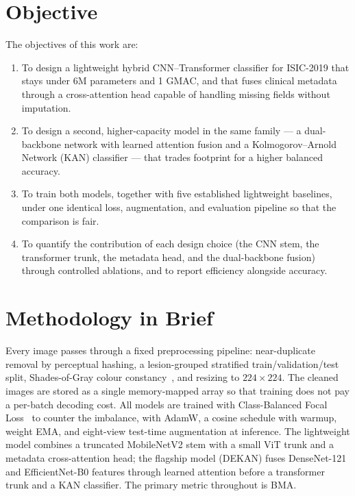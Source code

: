\section{Objective}

The objectives of this work are:

\begin{enumerate}
  \item To design a lightweight hybrid CNN--Transformer classifier for
        ISIC-2019 that stays under 6M parameters and 1 GMAC, and that fuses
        clinical metadata through a cross-attention head capable of handling
        missing fields without imputation.
  \item To design a second, higher-capacity model in the same family --- a
        dual-backbone network with learned attention fusion and a
        Kolmogorov--Arnold Network (KAN) classifier --- that trades footprint
        for a higher balanced accuracy.
  \item To train both models, together with five established lightweight
        baselines, under one identical loss, augmentation, and evaluation
        pipeline so that the comparison is fair.
  \item To quantify the contribution of each design choice (the CNN stem, the
        transformer trunk, the metadata head, and the dual-backbone fusion)
        through controlled ablations, and to report efficiency alongside
        accuracy.
\end{enumerate}

\section{Methodology in Brief}

Every image passes through a fixed preprocessing pipeline: near-duplicate
removal by perceptual hashing, a lesion-grouped stratified train/validation/test
split, Shades-of-Gray colour constancy~\cite{finlayson2004shadesofgray}, and
resizing to $224\times224$. The cleaned images are stored as a single memory-mapped
array so that training does not pay a per-batch decoding cost. All models are
trained with Class-Balanced Focal Loss~\cite{cui2019classbalanced,lin2017focal}
to counter the imbalance, with AdamW, a cosine schedule with warmup, weight
EMA, and eight-view test-time augmentation at inference. The lightweight model
combines a truncated MobileNetV2 stem with a small ViT trunk and a metadata
cross-attention head; the flagship model (DEKAN) fuses DenseNet-121 and
EfficientNet-B0 features through learned attention before a transformer trunk and
a KAN classifier. The primary metric throughout is BMA.

